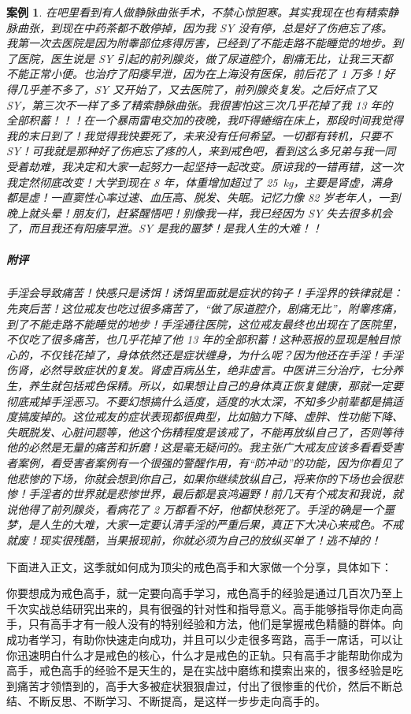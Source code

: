\documentclass{ctexart}
\newtheorem{case}{案例}
\begin{document}
\begin{case}
    在吧里看到有人做静脉曲张手术，不禁心惊胆寒。其实我现在也有精索静脉曲张，到现在中药茶都不敢停掉，因为我 SY 没有停，总是好了伤疤忘了疼。我第一次去医院是因为附睾部位疼得厉害，已经到了不能走路不能睡觉的地步。到了医院，医生说是 SY 引起的前列腺炎，做了尿道腔介，剧痛无比，让我三天都不能正常小便。也治疗了阳痿早泄，因为在上海没有医保，前后花了 1 万多！好得几乎差不多了，SY 又开始了，又去医院了，前列腺炎复发。之后好点了又 SY，第三次不一样了多了精索静脉曲张。我很害怕这三次几乎花掉了我 13 年的全部积蓄！！！在一个暴雨雷电交加的夜晚，我吓得蜷缩在床上，那段时间我觉得我的末日到了！我觉得我快要死了，未来没有任何希望。一切都有转机，只要不 SY！可我就是那种好了伤疤忘了疼的人，来到戒色吧，看到这么多兄弟与我一同受着劫难，我决定和大家一起努力一起坚持一起改变。原谅我的一错再错，这一次我定然彻底改变！大学到现在 8 年，体重增加超过了 \SI{25}{\kilo\gram}，主要是肾虚，满身都是虚！一直窦性心率过速、血压高、脱发、失眠。记忆力像 82 岁老年人，一到晚上就头晕！朋友们，赶紧醒悟吧！别像我一样，我已经因为 SY 失去很多机会了，而且我还有阳痿早泄。SY 是我的噩梦！是我人生的大难！！
    \subparagraph{附评} 手淫会导致痛苦！快感只是诱饵！诱饵里面就是症状的钩子！手淫界的铁律就是：先爽后苦！这位戒友也吃过很多痛苦了，“做了尿道腔介，剧痛无比”，附睾疼痛，到了不能走路不能睡觉的地步！手淫通往医院，这位戒友最终也出现在了医院里，不仅吃了很多痛苦，也几乎花掉了他 13 年的全部积蓄！这种恶报的显现是触目惊心的，不仅钱花掉了，身体依然还是症状缠身，为什么呢？因为他还在手淫！手淫伤肾，必然导致症状的复发。肾虚百病丛生，绝非虚言。中医讲三分治疗，七分养生，养生就包括戒色保精。所以，如果想让自己的身体真正恢复健康，那就一定要彻底戒掉手淫恶习。不要幻想搞什么适度，适度的水太深，不知多少前辈都是搞适度搞废掉的。这位戒友的症状表现都很典型，比如脑力下降、虚胖、性功能下降、失眠脱发、心脏问题等，他这个伤精程度是该戒了，不能再放纵自己了，否则等待他的必然是无量的痛苦和折磨！这是毫无疑问的。我主张广大戒友应该多看看受害者案例，看受害者案例有一个很强的警醒作用，有“防冲动”的功能，因为你看见了他悲惨的下场，你就会想到你自己，如果你继续放纵自己，将来你的下场也会很悲惨！手淫者的世界就是悲惨世界，最后都是哀鸿遍野！前几天有个戒友和我说，就说他得了前列腺炎，看病花了 2 万都看不好，他都快愁死了。手淫的确是一个噩梦，是人生的大难，大家一定要认清手淫的严重后果，真正下大决心来戒色。不戒就废！现实很残酷，当果报现前，你就必须为自己的放纵买单了！逃不掉的！
\end{case}

下面进入正文，这季就如何成为顶尖的戒色高手和大家做一个分享，具体如下：

你要想成为戒色高手，就一定要向高手学习，戒色高手的经验是通过几百次乃至上千次实战总结研究出来的，具有很强的针对性和指导意义。高手能够指导你走向高手，只有高手才有一般人没有的特别经验和方法，他们是掌握戒色精髓的群体。向成功者学习，有助你快速走向成功，并且可以少走很多弯路，高手一席话，可以让你迅速明白什么才是戒色的核心，什么才是戒色的正轨。只有高手才能帮助你成为高手，戒色高手的经验不是天生的，是在实战中磨练和摸索出来的，很多经验是吃到痛苦才领悟到的，高手大多被症状狠狠虐过，付出了很惨重的代价，然后不断总结、不断反思、不断学习、不断提高，是这样一步步走向高手的。
\end{document}
